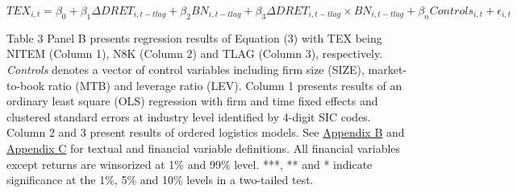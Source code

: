 \newpage

\setcounter{equation}{2}
\begin{equation}
TEX_{i,t}=\beta_0+\beta_1\Delta DRET_{i,t-tlag}+\beta_2BN_{i,t-tlag}+\beta_3\Delta DRET_{i,t-tlag}\times BN_{i,t-tlag}+\beta_nControls_{i,t}+\epsilon_{i,t}
\end{equation}

Table 3 Panel B presents regression results of Equation (3) with TEX being NITEM (Column 1), N8K (Column 2) and TLAG (Column 3), respectively. \textit{Controls} denotes a vector of control variables including firm size (SIZE), market-to-book ratio (MTB) and leverage ratio (LEV). Column 1 presents results of an ordinary least square (OLS) regression with firm and time fixed effects and clustered standard errors at industry level identified by 4-digit SIC codes. Column 2 and 3 present results of ordered logistics models. See \hyperref[appb]{Appendix B} and \hyperref[appc]{Appendix C} for textual and financial variable definitions. All financial variables except returns are winsorized at 1\% and 99\% level. ***, ** and * indicate significance at the 1\%, 5\% and 10\% levels in a two-tailed test.